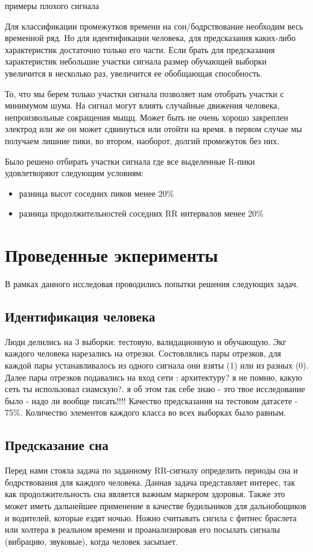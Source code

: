 примеры плохого сигнала

Для классификации промежутков времени на сон/бодрствование необходим весь временной ряд. Но для идентификации человека, для предсказания каких-либо характеристик достаточно только его части. Если брать для предсказания характеристик небольшие участки сигнала размер обучающей выборки увеличится в несколько раз, увеличится ее обобщающая способность.

То, что мы берем только участки сигнала позволяет нам отобрать участки с минимумом шума. На сигнал могут влиять случайные движения человека, непроизвольные сокращения мыщц. Может быть не очень хорошо закреплен электрод или же он может сдвинуться или отойти на время. в первом случае мы получаем лишние пики, во втором, наоборот, долгий промежуток без них. 

Было решено отбирать участки сигнала где все выделенные R-пики удовлетворяют следующим условиям:

\begin{itemize}
	\item разница высот соседних пиков менее 20\%
	\item разница продолжительностей соседних RR интервалов менее 20\%
\end{itemize}

\section{Проведенные экперименты}

В рамках данного исследовая проводились попытки решения следующих задач.
\subsection{Идентификация человека}

Люди делились на 3 выборки: тестовую, валидационную и обучающую. Экг каждого человека нарезались на отрезки. Состовлялись пары отрезков, для каждой пары устанавливалось из одного сигнала они взяты (1) или из разных (0). Далее пары отрезков подавались на вход сети :
 архитектуру? я не помню, какую сеть ты использовал сиамскую?. я об этом так себе знаю - это твое исследование было - надо ли вообще писать!!!!
Качество предсказания на тестовом датасете - 75\%. Количество элементов каждого класса во всех выборках было равным.
\subsection{Предсказание сна}
Перед нами стояла задача по заданному RR-сигналу определить периоды сна и бодрствования для каждого человека. Данная задача представляет интерес, так как продолжительность сна является важным маркером здоровья. Также это может иметь дальнейшее применение в качестве будильников для дальнобощиков и водителей, которые ездят ночью. Ножно считывать сигнла с фитнес браслета или холтера в реальном времени и проанализировав его посылать сигналы (вибрацию, звуковые), когда человек засыпает.

